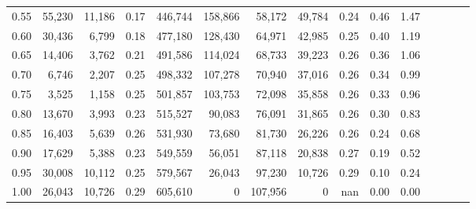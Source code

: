 \begin{tabular}{rrrcrrrrrrrrrrr}
0.55 &  55,230 &  11,186 &                                       0.17 &  446,744 &  158,866 &   58,172 &   49,784 &  0.24 &  0.46 &                         1.47 \\
0.60 &  30,436 &   6,799 &                                       0.18 &  477,180 &  128,430 &   64,971 &   42,985 &  0.25 &  0.40 &                         1.19 \\
0.65 &  14,406 &   3,762 &                                       0.21 &  491,586 &  114,024 &   68,733 &   39,223 &  0.26 &  0.36 &                         1.06 \\
0.70 &   6,746 &   2,207 &                                       0.25 &  498,332 &  107,278 &   70,940 &   37,016 &  0.26 &  0.34 &                         0.99 \\
0.75 &   3,525 &   1,158 &                                       0.25 &  501,857 &  103,753 &   72,098 &   35,858 &  0.26 &  0.33 &                         0.96 \\
0.80 &  13,670 &   3,993 &                                       0.23 &  515,527 &   90,083 &   76,091 &   31,865 &  0.26 &  0.30 &                         0.83 \\
0.85 &  16,403 &   5,639 &                                       0.26 &  531,930 &   73,680 &   81,730 &   26,226 &  0.26 &  0.24 &                         0.68 \\
0.90 &  17,629 &   5,388 &                                       0.23 &  549,559 &   56,051 &   87,118 &   20,838 &  0.27 &  0.19 &                         0.52 \\
0.95 &  30,008 &  10,112 &                                       0.25 &  579,567 &   26,043 &   97,230 &   10,726 &  0.29 &  0.10 &                         0.24 \\
1.00 &  26,043 &  10,726 &                                       0.29 &  605,610 &        0 &  107,956 &        0 &   nan &  0.00 &                         0.00 \\
\bottomrule
\end{tabular}
